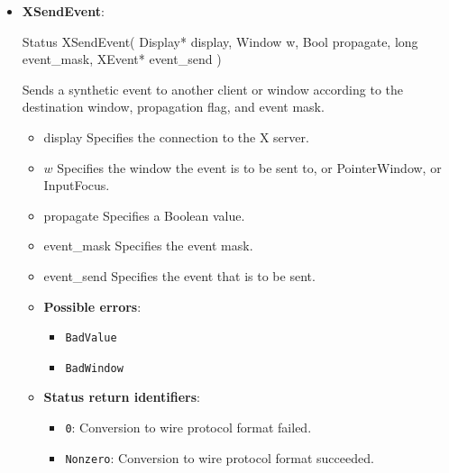 \documentclass{report}
\begin{document}
\begin{itemize}
\begin{cppcode}
{                    Window above;
                    Bool override_redirect;
                } XConfigureEvent;
            \end{cppcode}
        \item \textbf{XSendEvent}:
            \bigbreak \noindent 
            \begin{cppcode}
                Status XSendEvent(
                    Display* display,
                    Window w,
                    Bool propagate,
                    long event_mask,
                    XEvent* event_send
                )
            \end{cppcode}
            \bigbreak \noindent
            Sends a synthetic event to another client or window according to the destination window, propagation flag, and event mask.
            \begin{itemize}
                \item display Specifies the connection to the X server.
                \item $w$ Specifies the window the event is to be sent to, or PointerWindow, or InputFocus.
                \item propagate Specifies a Boolean value.
                \item event\_mask Specifies the event mask.
                \item event\_send Specifies the event that is to be sent.
            \end{itemize}
            \begin{itemize}
                \item \textbf{Possible errors}:
                    \begin{itemize}
                        \item \texttt{BadValue}
                        \item \texttt{BadWindow}
                    \end{itemize}
                \item \textbf{Status return identifiers}:
                    \begin{itemize}
                        \item \texttt{0}: Conversion to wire protocol format failed.
                        \item \texttt{Nonzero}: Conversion to wire protocol format succeeded.
                    \end{itemize}
            \end{itemize}

    \end{itemize}
    
\end{document}
